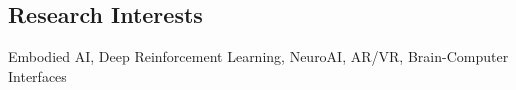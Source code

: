 \subsection*{\textbf{Research Interests}}
Embodied AI, Deep Reinforcement Learning, NeuroAI, AR/VR, Brain-Computer Interfaces
